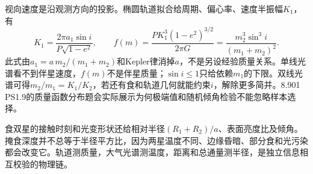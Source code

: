 视向速度是沿观测方向的投影。椭圆轨道拟合给周期、偏心率、速度半振幅$K_1$，有
\[
 K_1=\frac{2\pi a_1\sin i}{P\sqrt{1-e^2}},\qquad
 f(m)=\frac{PK_1^3(1-e^2)^{3/2}}{2\pi G}
 =\frac{m_2^3\sin^3i}{(m_1+m_2)^2}.
\]
此式由$a_1=a\,m_2/(m_1+m_2)$和Kepler律消掉$a$，不是另设经验质量关系。单线光谱看不到伴星速度，$f(m)$不是伴星质量；$\sin i\le1$只给依赖$m_1$的下限。双线光谱可得$m_2/m_1=K_1/K_2$，若还有食和轨道几何就能约束$i$，解除更多简并。8.901 PS1.9的质量函数分布题会实际展示为何极端值和随机倾角检验不能忽略样本选择。

食双星的接触时刻和光变形状还给相对半径$(R_1+R_2)/a$、表面亮度比及倾角。掩食深度并不总等于半径平方比，因为两星温度不同、边缘昏暗、部分食和光污染都会改变它。轨道测质量，大气光谱测温度，距离和总通量测半径，是独立信息相互校验的物理链。
